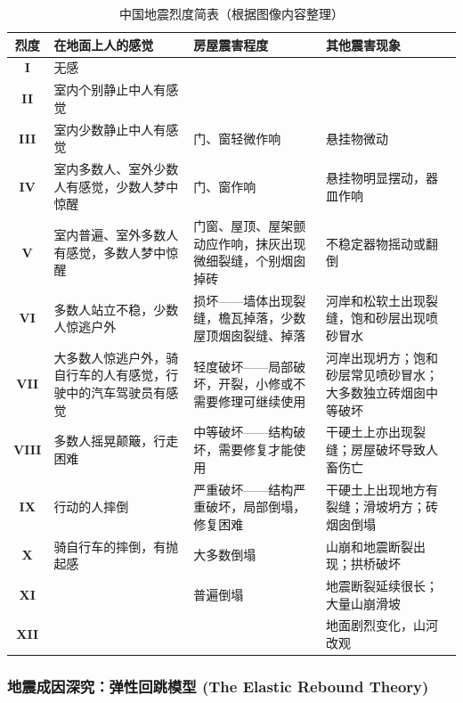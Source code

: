 \documentclass[12pt,a4paper]{article}
\begin{document}
	\begin{table}[htbp]
		\centering
		\small
		\renewcommand{\arraystretch}{1.3} %
		\begin{tabularx}{\textwidth}{|c|X|X|X|}
			\hline
			\textbf{烈度} & \textbf{在地面上人的感觉} & \textbf{房屋震害程度} & \textbf{其他震害现象} \\ \hline
			\textbf{I} & 无感 & & \\ \hline
			\textbf{II} & 室内个别静止中人有感觉 & & \\ \hline
			\textbf{III} & 室内少数静止中人有感觉 & 门、窗轻微作响 & 悬挂物微动 \\ \hline
			\textbf{IV} & 室内多数人、室外少数人有感觉，少数人梦中惊醒 & 门、窗作响 & 悬挂物明显摆动，器皿作响 \\ \hline
			\textbf{V} & 室内普遍、室外多数人有感觉，多数人梦中惊醒 & 门窗、屋顶、屋架颤动应作响，抹灰出现微细裂缝，个别烟囱掉砖 & 不稳定器物摇动或翻倒 \\ \hline
			\textbf{VI} & 多数人站立不稳，少数人惊逃户外 & 损坏——墙体出现裂缝，檐瓦掉落，少数屋顶烟囱裂缝、掉落 & 河岸和松软土出现裂缝，饱和砂层出现喷砂冒水 \\ \hline
			\textbf{VII} & 大多数人惊逃户外，骑自行车的人有感觉，行驶中的汽车驾驶员有感觉 & 轻度破坏——局部破坏，开裂，小修或不需要修理可继续使用 & 河岸出现坍方；饱和砂层常见喷砂冒水；大多数独立砖烟囱中等破坏 \\ \hline
			\textbf{VIII} & 多数人摇晃颠簸，行走困难 & 中等破坏——结构破坏，需要修复才能使用 & 干硬土上亦出现裂缝；房屋破坏导致人畜伤亡 \\ \hline
			\textbf{IX} & 行动的人摔倒 & 严重破坏——结构严重破坏，局部倒塌，修复困难 & 干硬土上出现地方有裂缝；滑坡坍方；砖烟囱倒塌 \\ \hline
			\textbf{X} & 骑自行车的摔倒，有抛起感 & 大多数倒塌 & 山崩和地震断裂出现；拱桥破坏 \\ \hline
			\textbf{XI} & & 普遍倒塌 & 地震断裂延续很长；大量山崩滑坡 \\ \hline
			\textbf{XII} & & & 地面剧烈变化，山河改观 \\ \hline
		\end{tabularx}
		\caption{中国地震烈度简表（根据图像内容整理）}
	\end{table}
	
	\subsubsection{地震成因深究：弹性回跳模型 (The Elastic Rebound Theory)}
	
\end{document}
